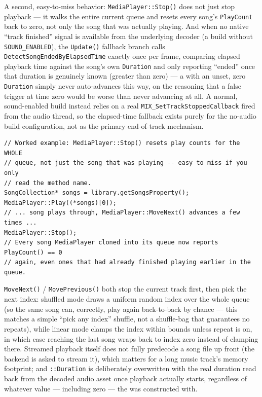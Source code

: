 A second, easy-to-miss behavior: \texttt{MediaPlayer::Stop()} does not just stop playback ---
it walks the entire current queue and resets every song's \texttt{PlayCount} back to zero, not
only the song that was actually playing. And when no native ``track finished'' signal is
available from the underlying decoder (a build without \texttt{SOUND\_ENABLED}), the
\texttt{Update()} fallback branch calls \texttt{DetectSongEndedByElapsedTime} exactly once per
frame, comparing elapsed playback time against the song's own \texttt{Duration} and only
reporting ``ended'' once that duration is genuinely known (greater than zero) --- a
 with an unset, zero \texttt{Duration} simply never auto-advances this way, on
the reasoning that a false trigger at time zero would be worse than never advancing at all. A
normal, sound-enabled build instead relies on a real \texttt{MIX\_SetTrackStoppedCallback} fired
from the audio thread, so the elapsed-time fallback exists purely for the no-audio build
configuration, not as the primary end-of-track mechanism.

\begin{lstlisting}
// Worked example: MediaPlayer::Stop() resets play counts for the WHOLE
// queue, not just the song that was playing -- easy to miss if you only
// read the method name.
SongCollection* songs = library.getSongsProperty();
MediaPlayer::Play((*songs)[0]);
// ... song plays through, MediaPlayer::MoveNext() advances a few times ...
MediaPlayer::Stop();
// Every song MediaPlayer cloned into its queue now reports PlayCount() == 0
// again, even ones that had already finished playing earlier in the queue.
\end{lstlisting}

\texttt{MoveNext()} / \texttt{MovePrevious()} both stop the current track first, then pick the
next index: shuffled mode draws a uniform random index over the whole queue (so the same song
can, correctly, play again back-to-back by chance --- this matches a simple ``pick any index''
shuffle, not a shuffle-bag that guarantees no repeats), while linear mode clamps the index
within bounds unless repeat is on, in which case reaching the last song wraps back to index
zero instead of clamping there. Streamed playback itself does not fully predecode a song file
up front (the backend is asked to stream it), which matters for a long music track's memory
footprint; and \texttt{::Duration} is deliberately overwritten with the real
duration read back from the decoded audio asset once playback actually starts, regardless of
whatever value --- including zero --- the  was constructed with.

